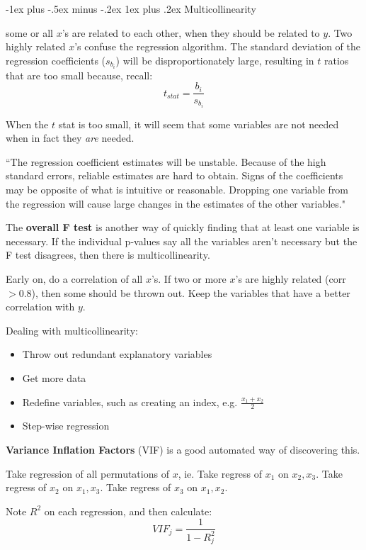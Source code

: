 \documentclass[10pt,landscape]{article}
\makeatletter
\renewcommand{\subsubsection}{\@startsection{subsubsection}{3}{0mm}%
                                {-1ex plus -.5ex minus -.2ex}%
                                {1ex plus .2ex}%
                                {\normalfont\small\bfseries}}
\makeatother
\begin{document}
\begin{multicols*}{3}
\subsubsection{Multicollinearity}

some or all $x$'s are related to each other, when they should be related to $y$. Two highly related $x$'s  confuse the regression algorithm. The standard deviation of the regression coefficients ($s_{b_i}$) will be disproportionately large, resulting in $t$ ratios that are too small because, recall:
\[
t_{stat} = \frac{b_i} {s_{b_i}}
\]

When the $t$ stat is too small, it will seem that some variables are not needed when in fact they \textit{are} needed.

``The regression coefficient estimates will be unstable. Because of the high standard errors, reliable estimates are hard to obtain. Signs of the coefficients may be opposite of what is intuitive or reasonable. Dropping one variable from the regression will cause large changes in the estimates of the other variables."

The \textbf{overall F test} is another way of quickly finding that at least one variable is necessary. If the individual p-values say all the variables aren't necessary but the F test disagrees, then there is multicollinearity.

Early on, do a correlation of all $x$'s. If two or more $x$'s are highly related (corr $> 0.8$), then some should be thrown out. Keep the variables that have a better correlation with $y$. 

Dealing with multicollinearity:
\begin{itemize}
\item{Throw out redundant explanatory variables}
\item{Get more data}
\item{Redefine variables, such as creating an index, e.g. $\frac{x_1 + x_2}{2}$}
\item{Step-wise regression}
\end{itemize}

\textbf{Variance Inflation Factors} (VIF) is a good automated way of discovering this. 

Take regression of all permutations of $x$, ie. 
Take regress of $x_1$ on $x_2, x_3$.
Take regress of $x_2$ on $x_1, x_3$.
Take regress of $x_3$ on $x_1, x_2$.

Note $R^2$ on each regression, and then calculate:
\[
VIF_j = \frac{1} {1-R^2_j}
\]


\end{multicols*}
\end{document}
